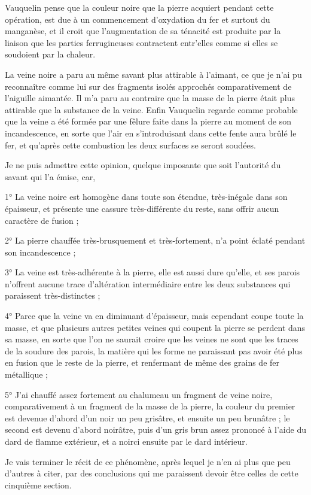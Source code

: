 \documentclass[a4paper, 12pt, oneside, french]{article}
\begin{document}
Vauquelin pense que la couleur noire que la pierre acquiert pendant cette opération, est due à un commencement d'oxydation du fer et surtout du manganèse, et il croit que l'augmentation de sa ténacité est produite par la liaison que les parties ferrugineuses contractent entr'elles comme si elles se soudoient par la chaleur.

La veine noire a paru au même savant plus attirable à l'aimant, ce que je n'ai pu reconnaître comme lui sur des fragments isolés approchés comparativement de l'aiguille aimantée. Il m'a paru au contraire que la masse de la pierre était plus attirable que la substance de la veine. Enfin Vauquelin regarde comme probable que la veine a été formée par une fêlure faite dans la pierre au moment de son incandescence, en sorte que l'air en s'introduisant dans cette fente aura brûlé le fer, et qu'après cette combustion les deux surfaces se seront soudées.

Je ne puis admettre cette opinion, quelque imposante que soit l'autorité du savant qui l'a émise, car,

1° La veine noire est homogène dans toute son étendue, très-inégale dans son épaisseur, et présente une cassure très-différente du reste, sans offrir aucun caractère de fusion ;

2° La pierre chauffée très-brusquement et très-fortement, n'a point éclaté pendant son incandescence ;

3° La veine est très-adhérente à la pierre, elle est aussi dure qu'elle, et ses parois n'offrent aucune trace d'altération intermédiaire entre les deux substances qui paraissent très-distinctes ;

4° Parce que la veine va en diminuant d'épaisseur, mais cependant coupe toute la masse, et que plusieurs autres petites veines qui coupent la pierre se perdent dans sa masse, en sorte que l'on ne saurait croire que les veines ne sont que les traces de la soudure des parois, la matière qui les forme ne paraissant pas avoir été plus en fusion que le reste de la pierre, et renfermant de même des grains de fer métallique ;

5° J'ai chauffé assez fortement au chalumeau un fragment de veine noire, comparativement à un fragment de la masse de la pierre, la couleur du premier est devenue d'abord d'un noir un peu grisâtre, et ensuite un peu brunâtre ; le second est devenu d'abord noirâtre, puis d'un gris brun assez prononcé à l'aide du dard de flamme extérieur, et a noirci ensuite par le dard intérieur.

Je vais terminer le récit de ce phénomène, après lequel je n'en ai plus que peu d'autres à citer, par des conclusions qui me paraissent devoir être celles de cette cinquième section.
\end{document}
